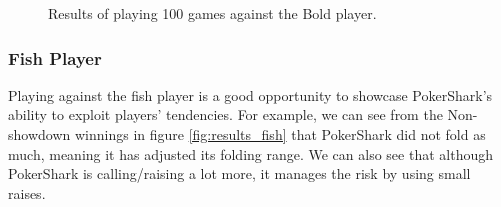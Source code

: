 \begin{figure}[H]
\begin{minipage}{\textwidth}
\begin{minipage}{0.5\textwidth}
        \end{minipage}
    \end{minipage}
    \caption{Results of playing 100 games against the Bold player.}
    \label{fig:results_bold}
\end{figure}

\subsubsection{Fish Player}
Playing against the fish player is a good opportunity to showcase PokerShark's ability to exploit players' tendencies. For example, we can see from the Non-showdown winnings in figure \ref{fig:results_fish} that PokerShark did not fold as much, meaning it has adjusted its folding range. We can also see that although PokerShark is calling/raising a lot more, it manages the risk by using small raises.

